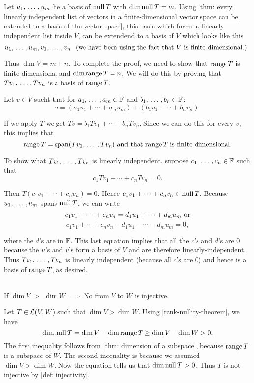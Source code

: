 \begin{prf}
  Let $u_1, {\, \ldots \,\,}, u_m$ be a basis of $\operatorname{null} T$ with $\dim \operatorname{null} T = m$. Using \ref{thm: every linearly independent list of vectors in a finite-dimensional vector space can be extended to a basis of the vector space}, this basis which forms a linearly independent list inside $V$, can be extendend to a basis of $V$ which looks like this
  \[
    u_1, {\, \ldots \,\,}, u_m, v_1, {\, \ldots \,\,}, v_n \;\;\, \text{(we have been using the fact that $V$ is finite-dimensional.)}\;\;
  \]

  Thus $\dim V = m+n$. To complete the proof, we need to show that $\operatorname{range} T$ is finite-dimensional and $\dim \operatorname{range} T = n$. We will do this by proving that $Tv_1, {\, \ldots \,\,}, Tv_n$ is a basis of $\operatorname{range} T$.

  Let $v \in V$ sucht that for $a_1, {\, \ldots \,\,}, a_m \in \mathbb{F}$ and $b_1, {\, \ldots \,\,}, b_n \in \mathbb{F}$:
  \[
    v= (a_1 u_1 + \cdots + a_m  u_m) + (b_1 v_1 + \cdots + b_n v_n).
  \]

  If we apply $T$ we get $Tv=b_1Tv_1+ \cdots + b_nTv_n$. Since we can do this for every $v$, this implies that
  \[
    \myrange T = \myspan{Tv_1, \ddd, Tv_n} $ and that $\myrange T$ is finite dimensional.$
  \]

   To show what $Tv_1, {\, \ldots \,\,}, Tv_n$ is linearly independent, suppose $c_1, {\, \ldots \,\,}, c_n \in \mathbb{F}$ such that
  \[
    c_1 Tv_1 + \cdots + c_n T v_n = 0.
  \]

  Then $T(c_1 v_1 + \cdots + c_n v_n) = 0.$ Hence $c_1 v_1 + \cdots + c_n v_n \in \operatorname{null} T$. Because $u_1, {\, \ldots \,\,}, u_m$ spans $\operatorname{null} T$, we can write
  \[
    c_1 v_1 + \cdots + c_n v_n = d_1 u_1 + \cdots +  d_m u_m $ or$
  \]
  \[
  c_1 v_1 + \cdots + c_n v_n - d_1 u_1 - \cdots - d_m u_m = 0,
  \]

  where the $d$'s are in $\mathbb{F}$. This last equation implies that all the $c$'s and $d$'s are $0$ because the $u$'s and $v$'s form a basis of $V$ and are therefore linearly-independent. Thus $Tv_1, {\, \ldots \,\,}, Tv_n$ is linearly independent (because all $c$'s are $0$) and hence is a basis of $\operatorname{range} T$, as desired.
\end{prf}


  \setcounter{thm}{21}
  \begin{thm} 
    \label{thm: linear-map-to-a-lower-dimensional-space-is-not-injective}
    \phantom{.}\\
    If $\dim V$ $>$ $\dim W$
    $\implies$ No \lm from $V$ to $W$ is injective.
  \end{thm}
  \begin{prf} Let $T\in \mathcal{L}(V,W)$ such that $\dim V > \dim W$. Using \ref{rank-nullity-theorem}, we have
    \begin{equation}
      \dim \operatorname{null} T = \dim V - \dim \operatorname{range} T \geq \dim V - \dim W > 0,
    \end{equation}
    The first inequality follows from \ref{thm: dimension of a subspace}, because $\operatorname{range} T$ is a subspace of $W$. The second inequality is because we assumed $\dim V > \dim W$. Now the equation tells us that $\dim \operatorname{null} T > 0$. Thus $T$ is not injective by \ref{def: injectivity}.
  \end{prf}

